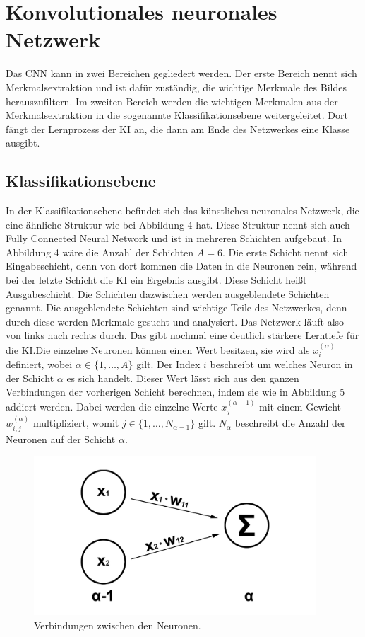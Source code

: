 \documentclass[11pt]{article}
\begin{document}
\section{Konvolutionales neuronales Netzwerk}

Das CNN kann in zwei Bereichen gegliedert werden. Der erste Bereich nennt sich
Merkmalsextraktion und ist dafür zuständig, die wichtige Merkmale des Bildes herauszufiltern. Im zweiten Bereich werden die
wichtigen Merkmalen aus der Merkmalsextraktion in die sogenannte Klassifikationsebene weitergeleitet. Dort fängt der Lernprozess
der KI an, die dann am Ende des Netzwerkes eine Klasse ausgibt.

\subsection{Klassifikationsebene}
In der Klassifikationsebene befindet sich das künstliches neuronales Netzwerk, die eine ähnliche Struktur wie bei Abbildung 4 hat.
Diese Struktur nennt sich auch Fully Connected Neural Network und ist in mehreren Schichten aufgebaut. In Abbildung 4 wäre die Anzahl
der Schichten $A = 6$. Die erste Schicht nennt sich Eingabeschicht, denn von dort kommen die Daten in die Neuronen rein, während bei
der letzte Schicht die KI ein Ergebnis ausgibt. Diese Schicht heißt Ausgabeschicht. Die Schichten dazwischen werden ausgeblendete Schichten genannt.
Die ausgeblendete Schichten sind wichtige Teile des Netzwerkes, denn durch diese werden Merkmale gesucht und analysiert.
Das Netzwerk läuft also von links nach rechts durch. Das gibt nochmal
eine deutlich stärkere Lerntiefe für die KI.\@ Die einzelne Neuronen können einen Wert besitzen, sie wird als $ x_{i}^{(\alpha)} $ definiert,
wobei $ \alpha \in \{1,\ldots,A\} $ gilt. Der Index $i$ beschreibt um welches Neuron in der Schicht $\alpha$ es sich handelt. Dieser Wert
lässt sich aus den ganzen Verbindungen der vorherigen Schicht berechnen, indem sie wie in Abbildung 5 addiert werden. Dabei werden
die einzelne Werte $ x_{j}^{(\alpha-1)} $ mit einem Gewicht $ w_{i,j}^{(\alpha)} $ multipliziert, womit $ j \in \{1,\ldots,N_{\alpha-1}\} $ gilt.
$ N_{\alpha} $ beschreibt die Anzahl der Neuronen auf der Schicht $\alpha$.
\begin{figure}[h]
    \centering
    \includegraphics[width=300pt, keepaspectratio]{images/verbindung}
    \caption{Verbindungen zwischen den Neuronen.}
\end{figure}
\end{document}
